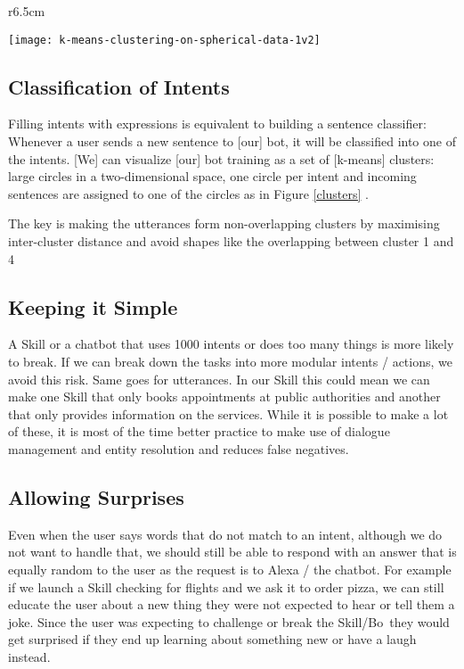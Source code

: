 \hspace*{-\parindent}%
\begin{minipage}[H]{\linewidth}

\begin{wrapfigure}{r}{6.5cm}
	\caption[K-means Clusters Example] {K-means Clusters of Utterances, based on Deschamps \cite{botbestbractis}}
	\label{clusters}
	\centering
	\texttt{[image: k-means-clustering-on-spherical-data-1v2]} 
\end{wrapfigure}




\subsection*{Classification of Intents}
Filling intents with expressions is equivalent to building a sentence classifier: Whenever a user sends a new sentence to [our] bot, it will be classified into one of the intents. [We] can visualize [our] bot training as a set of [k-means] clusters: large circles  in a two-dimensional space, one circle per intent and incoming sentences are assigned to one of the circles as in Figure \ref{clusters} \cite{botbestbractis}.

The key is making the utterances form non-overlapping clusters by maximising inter-cluster distance and avoid shapes like the overlapping between cluster 1 and 4

\end{minipage}


\subsection*{Keeping it Simple}

A Skill or a chatbot that uses 1000 intents or does too many things is more likely to break. If we can break down the tasks into more modular intents / actions, we avoid this risk. Same goes for utterances. In our Skill this could mean we can make one Skill that only books appointments at public authorities and another that only provides information on the services. While it is possible to make a lot of these, it is most of the time better practice to make use of dialogue management and entity resolution and reduces false negatives.


\subsection*{Allowing Surprises}
Even when the user says words that do not match to an intent, although we do not want to handle that, we should still be able to respond with an answer that is equally random to the user as the request is to Alexa / the chatbot. For example if we launch a Skill checking for flights and we ask it to order pizza, we can still educate the user about a new thing they were not expected to hear or tell them a joke. Since the user was expecting to challenge or break the Skill/Bo\, they would get surprised if they end up learning about something new or have a laugh instead.

